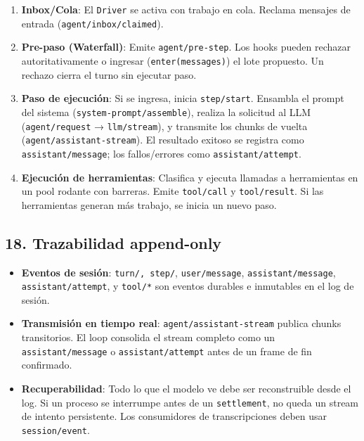 \documentclass[11pt,a4paper]{article}
\begin{document}
\begin{enumerate}[leftmargin=*,topsep=2pt,itemsep=1pt]
  \item \textbf{Inbox/Cola}: El \texttt{Driver} se activa con trabajo en cola. Reclama mensajes de entrada (\texttt{agent/inbox/claimed}).
  \item \textbf{Pre-paso (Waterfall)}: Emite \texttt{agent/pre-step}. Los hooks pueden rechazar autoritativamente o ingresar (\texttt{enter(messages)}) el lote propuesto. Un rechazo cierra el turno sin ejecutar paso.
  \item \textbf{Paso de ejecución}: Si se ingresa, inicia \texttt{step/start}. Ensambla el prompt del sistema (\texttt{system-prompt/assemble}), realiza la solicitud al LLM (\texttt{agent/request} → \texttt{llm/stream}), y transmite los chunks de vuelta (\texttt{agent/assistant-stream}). El resultado exitoso se registra como \texttt{assistant/message}; los fallos/errores como \texttt{assistant/attempt}.
  \item \textbf{Ejecución de herramientas}: Clasifica y ejecuta llamadas a herramientas en un pool rodante con barreras. Emite \texttt{tool/call} y \texttt{tool/result}. Si las herramientas generan más trabajo, se inicia un nuevo paso.
\end{enumerate}


\subsection*{18. Trazabilidad append-only}


\begin{itemize}[leftmargin=*,topsep=2pt,itemsep=1pt]
  \item \textbf{Eventos de sesión}: \texttt{turn/\textit{}, \texttt{step/}}, \texttt{user/message}, \texttt{assistant/message}, \texttt{assistant/attempt}, y \texttt{tool/*} son eventos durables e inmutables en el log de sesión.
  \item \textbf{Transmisión en tiempo real}: \texttt{agent/assistant-stream} publica chunks transitorios. El loop consolida el stream completo como un \texttt{assistant/message} o \texttt{assistant/attempt} antes de un frame de fin confirmado.
  \item \textbf{Recuperabilidad}: Todo lo que el modelo ve debe ser reconstruible desde el log. Si un proceso se interrumpe antes de un \texttt{settlement}, no queda un stream de intento persistente. Los consumidores de transcripciones deben usar \texttt{session/event}.
\end{itemize}
\end{document}
